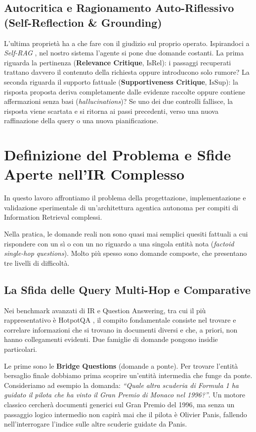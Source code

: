 \subsection{Autocritica e Ragionamento Auto-Riflessivo (Self-Reflection \& Grounding)}
L'ultima proprietà ha a che fare con il giudizio sul proprio operato. Ispirandoci a \textit{Self-RAG} \cite{asai2023selfrag}, nel nostro sistema l'agente si pone due domande costanti. La prima riguarda la pertinenza (\textbf{Relevance Critique}, $\text{IsRel}$): i passaggi recuperati trattano davvero il contenuto della richiesta oppure introducono solo rumore? La seconda riguarda il supporto fattuale (\textbf{Supportiveness Critique}, $\text{IsSup}$): la risposta proposta deriva completamente dalle evidenze raccolte oppure contiene affermazioni senza basi (\textit{hallucinations})? Se uno dei due controlli fallisce, la risposta viene scartata e si ritorna ai passi precedenti, verso una nuova raffinazione della query o una nuova pianificazione.

\section{Definizione del Problema e Sfide Aperte nell'IR Complesso}
\label{sec:definizione_problema}

In questo lavoro affrontiamo il problema della progettazione, implementazione e validazione sperimentale di un'architettura agentica autonoma per compiti di Information Retrieval complessi.

Nella pratica, le domande reali non sono quasi mai semplici quesiti fattuali a cui rispondere con un sì o con un no riguardo a una singola entità nota (\textit{factoid single-hop questions}). Molto più spesso sono domande composte, che presentano tre livelli di difficoltà.

\subsection{La Sfida delle Query Multi-Hop e Comparative}
Nei benchmark avanzati di IR e Question Answering, tra cui il più rappresentativo è HotpotQA \cite{yang2018hotpotqa}, il compito fondamentale consiste nel trovare e correlare informazioni che si trovano in documenti diversi e che, a priori, non hanno collegamenti evidenti. Due famiglie di domande pongono insidie particolari.

Le prime sono le \textbf{Bridge Questions} (domande a ponte). Per trovare l'entità bersaglio finale dobbiamo prima scoprire un'entità intermedia che funge da ponte. Consideriamo ad esempio la domanda: \textit{``Quale altra scuderia di Formula 1 ha guidato il pilota che ha vinto il Gran Premio di Monaco nel 1996?''}. Un motore classico cercherà documenti generici sul Gran Premio del 1996, ma senza un passaggio logico intermedio non capirà mai che il pilota è Olivier Panis, fallendo nell'interrogare l'indice sulle altre scuderie guidate da Panis.


